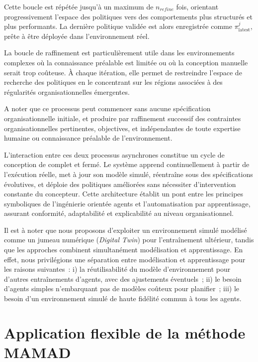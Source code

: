 Cette boucle est répétée jusqu'à un maximum de $n_{refine}$ fois, orientant progressivement l'espace des politiques vers des comportements plus structurés et plus performants. La dernière politique validée est alors enregistrée comme $\pi^j_{\text{latest}}$, prête à être déployée dans l'environnement réel.

La boucle de raffinement est particulièrement utile dans les environnements complexes où la connaissance préalable est limitée ou où la conception manuelle serait trop coûteuse. À chaque itération, elle permet de restreindre l'espace de recherche des politiques en le concentrant sur les régions associées à des régularités organisationnelles émergentes.

A noter que ce processus peut commencer sans aucune spécification organisationnelle initiale, et produire par raffinement successif des contraintes organisationnelles pertinentes, objectives, et indépendantes de toute expertise humaine ou connaissance préalable de l'environnement.

\noindent L'interaction entre ces deux processus asynchrones constitue un cycle de conception de  complet et fermé. Le système apprend continuellement à partir de l'exécution réelle, met à jour son modèle simulé, réentraîne sous des spécifications évolutives, et déploie des politiques améliorées sans nécessiter d'intervention constante du concepteur. Cette architecture établit un pont entre les principes symboliques de l'ingénierie orientée agents et l'automatisation par apprentissage, assurant conformité, adaptabilité et explicabilité au niveau organisationnel.

\noindent Il est à noter que nous proposons d'exploiter un environnement simulé modélisé comme un jumeau numérique (\textit{Digital Twin}) pour l'entraînement ultérieur, tandis que les approches  combinent simultanément modélisation et apprentissage. En effet, nous privilégions une séparation entre modélisation et apprentissage pour les raisons suivantes~: i) la réutilisabilité du modèle d'environnement pour d'autres entraînements d'agents, avec des ajustements éventuels~; \quad ii) le besoin d'agents simples n'embarquant pas de modèles coûteux pour planifier~; \quad iii) le besoin d'un environnement simulé de haute fidélité commun à tous les agents.

\section{Application flexible de la méthode MAMAD}
\label{subsec:mamad_flexible}

